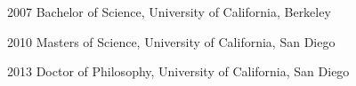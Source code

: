 \begin{vita}
\noindent
\begin{cv}{}
\begin{cvlist}{}
\item[2007] Bachelor of Science, University of California, Berkeley
\item[2010] Masters of Science, University of California, San Diego
\item[2013] Doctor of Philosophy, University of California, San Diego
\end{cvlist}
\end{cv}

\end{vita}
